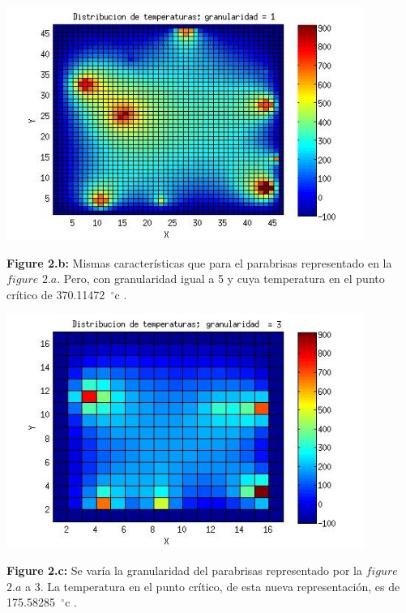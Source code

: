 \includegraphics[width=\textwidth,height=3.0in,keepaspectratio
]{45x45h1.jpg} \newline
\begin {flushleft}
\textbf{Figure 2.b:} Mismas características que para el parabrisas representado en la $figure$ $2.a$. Pero, con granularidad igual a 5 y cuya temperatura en el punto crítico de 370.11472\hspace{-1.5mm}$\phantom{a}^{\circ}$c .
\end{flushleft}

\includegraphics[width=\textwidth,height=3.0in,keepaspectratio
]{45x45h3.jpg} \newline
\begin {flushleft}
\textbf{Figure 2.c:} Se varía la granularidad del parabrisas representado por la $figure$ $2.a$ a 3. La temperatura en el punto crítico, de esta nueva representación, es de 175.58285\hspace{-1.5mm}$\phantom{a}^{\circ}$c .
\end{flushleft}

